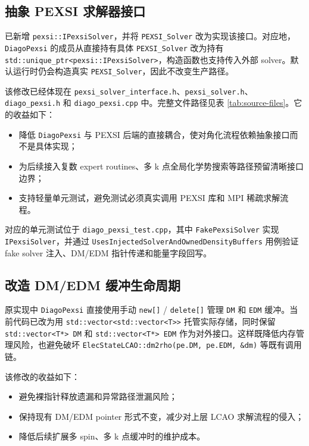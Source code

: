 \documentclass[a4paper,11pt]{article}
\newcommand{\code}[1]{\texttt{#1}}
\begin{document}
\subsection{抽象 PEXSI 求解器接口}

已新增 \code{pexsi::IPexsiSolver}，并将 \code{PEXSI\_Solver} 改为实现该接口。对应地，\code{DiagoPexsi} 的成员从直接持有具体 \code{PEXSI\_Solver} 改为持有 \code{std::unique\_ptr<pexsi::IPexsiSolver>}，构造函数也支持传入外部 solver。默认运行时仍会构造真实 \code{PEXSI\_Solver}，因此不改变生产路径。

该修改已经体现在 \code{pexsi\_solver\_interface.h}、\code{pexsi\_solver.h}、\code{diago\_pexsi.h} 和 \code{diago\_pexsi.cpp} 中。完整文件路径见表 \ref{tab:source-files}。它的收益如下：

\begin{itemize}
    \item 降低 \code{DiagoPexsi} 与 PEXSI 后端的直接耦合，使对角化流程依赖抽象接口而不是具体实现；
    \item 为后续接入复数 expert routines、多 k 点全局化学势搜索等路径预留清晰接口边界；
    \item 支持轻量单元测试，避免测试必须真实调用 PEXSI 库和 MPI 稀疏求解流程。
\end{itemize}

对应的单元测试位于 \code{diago\_pexsi\_test.cpp}，其中 \code{FakePexsiSolver} 实现 \code{IPexsiSolver}，并通过 \code{UsesInjectedSolverAndOwnedDensityBuffers} 用例验证 fake solver 注入、DM/EDM 指针传递和能量字段回写。

\subsection{改造 DM/EDM 缓冲生命周期}

原实现中 \code{DiagoPexsi} 直接使用手动 \code{new[]} / \code{delete[]} 管理 \code{DM} 和 \code{EDM} 缓冲。当前代码已改为用 \code{std::vector<std::vector<T>>} 托管实际存储，同时保留 \code{std::vector<T*> DM} 和 \code{std::vector<T*> EDM} 作为对外接口。这样既降低内存管理风险，也避免破坏 \code{ElecStateLCAO::dm2rho(pe.DM, pe.EDM, \&dm)} 等既有调用链。

该修改的收益如下：

\begin{itemize}
    \item 避免裸指针释放遗漏和异常路径泄漏风险；
    \item 保持现有 DM/EDM pointer 形式不变，减少对上层 LCAO 求解流程的侵入；
    \item 降低后续扩展多 spin、多 k 点缓冲时的维护成本。
\end{itemize}
\end{document}
